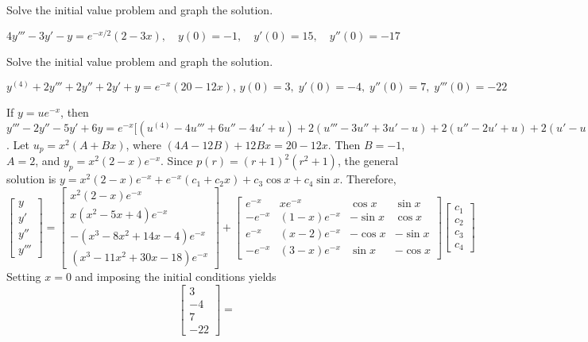 \documentclass{ximera}
\begin{document}
\begin{problem}\label{exer:9.3.71} Solve the initial value problem and graph the solution. 

$4y'''-3y'-y=e^{-x/2}(2-3x),\quad
y(0)=-1,
\quad y'(0)=15,\quad y''(0)=-17$
\end{problem}

\begin{problem}\label{exer:9.3.72}  Solve the initial value problem and graph the solution.

$y^{(4)}+2y'''+2y''+2y'+y=e^{-x}(20-12x),\,
y(0)=3,\; y'(0)=-4,\; y''(0)=7,\; y'''(0)=-22$

\begin{solution}
If $y=ue^{-x}$, then $y'''-2y''-5y'+6y=e^{-x}[
(u^{(4)}-4u'''+6u''-4u'+u) +2(u'''-3u''+3u'-u) +2(u''-2u'+u) +2(u'-u)
+u=e^{-x}(u^{(4)}-2u'''+2u'')$. Let $u_p=x^2(A+Bx)$, where
$(4A-12B)+12Bx=20-12x$. Then $B=-1$,
 $A=2$, and $y_p=x^2(2-x)e^{-x}$. Since $p(r)=(r+1)^2(r^2+1)$,
the general solution is
$y=x^2(2-x)e^{-x}+e^{-x}(c_1+c_2x)+c_3\cos x+c_4\sin x$.
 Therefore,
$$
\left[\begin{array}{l}y\\y'\\y''\\y'''\end{array}\right]=
\left[\begin{array}{c}
x^2(2-x)e^{-x}\\
x(x^2-5x+4)e^{-x}\\
-(x^3-8x^2+14x-4)e^{-x}\\
(x^3-11x^2+30x-18)e^{-x}
\end{array}\right]+
\left[\begin{array}{rcrr}e^{-x}&xe^{-x}&\cos x&\sin x\\
-e^{-x}&(1-x)e^{-x}&-\sin x&\cos x\\
e^{-x}&(x-2)e^{-x}&-\cos x&-\sin x\\
-e^{-x}&(3-x)e^{-x}&\sin x&-\cos x\end{array}\right]
\left[\begin{array}{c}
c_1\\c_2\\c_3\\c_4
\end{array}\right]
$$
Setting $x=0$ and imposing the initial conditions yields
$$
\left[\begin{array}{r}
3\\-4\\7\\-22
\end{array}\right]=
$$
\end{solution}
\end{problem}
\end{document}
